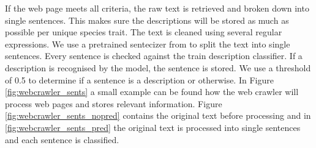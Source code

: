 \documentclass[a4paper, 12pt, oneside]{book} %
\begin{document}
If the web page meets all criteria, the raw text is retrieved and broken down into single sentences. 
This makes sure the descriptions will be stored as much as possible per unique species trait.
The text is cleaned using several regular expressions. %
We use a pretrained sentecizer from \textcite{wolf_huggingfaces_2020} to split the text into single sentences.
Every sentence is checked against the train description classifier.
If a description is recognised by the model, the sentence is stored.
We use a threshold of 0.5 to determine if a sentence is a description or otherwise.
In Figure \ref{fig:webcrawler_sents} a small example can be found how the web crawler will process web pages and stores relevant information. 
Figure \ref{fig:webcrawler_sents_nopred} contains the original text before processing and in \ref{fig:webcrawler_sents_pred} the original text is processed into single sentences and each sentence is classified.
\end{document}
